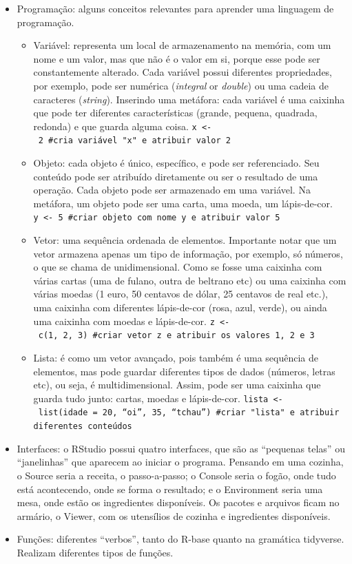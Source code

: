\documentclass[
  10pt,
  brazil,
  a4paper,
  twoside, notitlepage, openright]{book}
\providecommand{\tightlist}{%
  \setlength{\itemsep}{0pt}\setlength{\parskip}{0pt}}
\begin{document}
\begin{itemize}
\item
  Programação: alguns conceitos relevantes para aprender uma linguagem de programação.

  \begin{itemize}
  \tightlist
  \item
    Variável: representa um local de armazenamento na memória, com um nome e um valor, mas que não é o valor em si, porque esse pode ser constantemente alterado. Cada variável possui diferentes propriedades, por exemplo, pode ser numérica (\emph{integral} or \emph{double}) ou uma cadeia de caracteres (\emph{string}). Inserindo uma metáfora: cada variável é uma caixinha que pode ter diferentes características (grande, pequena, quadrada, redonda) e que guarda alguma coisa. \texttt{x\ \textless{}-\ 2\ \#cria\ variável\ "x"\ e\ atribuir\ valor\ 2}
  \item
    Objeto: cada objeto é único, específico, e pode ser referenciado. Seu conteúdo pode ser atribuído diretamente ou ser o resultado de uma operação. Cada objeto pode ser armazenado em uma variável. Na metáfora, um objeto pode ser uma carta, uma moeda, um lápis-de-cor. \texttt{y\ \textless{}-\ 5\ \#criar\ objeto\ com\ nome\ y\ e\ atribuir\ valor\ 5}
  \item
    Vetor: uma sequência ordenada de elementos. Importante notar que um vetor armazena apenas um tipo de informação, por exemplo, só números, o que se chama de unidimensional. Como se fosse uma caixinha com várias cartas (uma de fulano, outra de beltrano etc) ou uma caixinha com várias moedas (1 euro, 50 centavos de dólar, 25 centavos de real etc.), uma caixinha com diferentes lápis-de-cor (rosa, azul, verde), ou ainda uma caixinha com moedas e lápis-de-cor. \texttt{z\ \textless{}-\ c(1,\ 2,\ 3)\ \#criar\ vetor\ z\ e\ atribuir\ os\ valores\ 1,\ 2\ e\ 3}
  \item
    Lista: é como um vetor avançado, pois também é uma sequência de elementos, mas pode guardar diferentes tipos de dados (números, letras etc), ou seja, é multidimensional. Assim, pode ser uma caixinha que guarda tudo junto: cartas, moedas e lápis-de-cor. \texttt{lista\ \textless{}-\ list(idade\ =\ 20,\ “oi”,\ 35,\ “tchau”)\ \#criar\ "lista"\ e\ atribuir\ diferentes\ conteúdos}
  \end{itemize}
\item
  Interfaces: o RStudio possui quatro interfaces, que são as ``pequenas telas'' ou ``janelinhas'' que aparecem ao iniciar o programa. Pensando em uma cozinha, o Source seria a receita, o passo-a-passo; o Console seria o fogão, onde tudo está acontecendo, onde se forma o resultado; e o Environment seria uma mesa, onde estão os ingredientes disponíveis. Os pacotes e arquivos ficam no armário, o Viewer, com os utensílios de cozinha e ingredientes disponíveis.
\item
  Funções: diferentes ``verbos'', tanto do R-base quanto na gramática tidyverse. Realizam diferentes tipos de funções.


\end{itemize}
\end{document}
